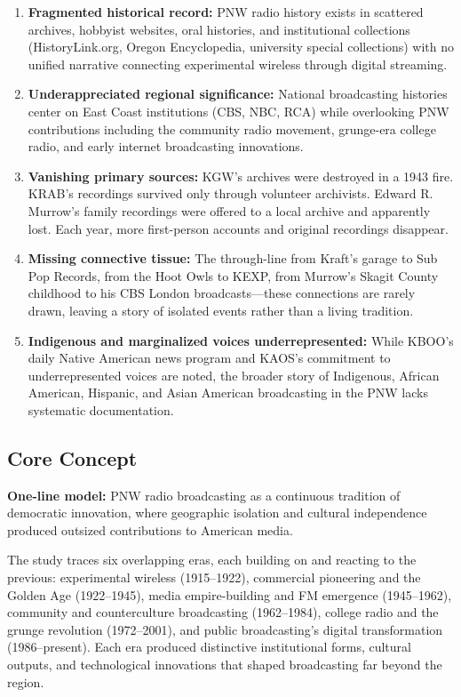 \documentclass[11pt,letterpaper]{article}
\begin{document}
\begin{enumerate}[leftmargin=2em]
\item \textbf{Fragmented historical record:} PNW radio history exists in scattered archives, hobbyist websites, oral histories, and institutional collections (HistoryLink.org, Oregon Encyclopedia, university special collections) with no unified narrative connecting experimental wireless through digital streaming.
\item \textbf{Underappreciated regional significance:} National broadcasting histories center on East Coast institutions (CBS, NBC, RCA) while overlooking PNW contributions including the community radio movement, grunge-era college radio, and early internet broadcasting innovations.
\item \textbf{Vanishing primary sources:} KGW's archives were destroyed in a 1943 fire. KRAB's recordings survived only through volunteer archivists. Edward R. Murrow's family recordings were offered to a local archive and apparently lost. Each year, more first-person accounts and original recordings disappear.
\item \textbf{Missing connective tissue:} The through-line from Kraft's garage to Sub Pop Records, from the Hoot Owls to KEXP, from Murrow's Skagit County childhood to his CBS London broadcasts---these connections are rarely drawn, leaving a story of isolated events rather than a living tradition.
\item \textbf{Indigenous and marginalized voices underrepresented:} While KBOO's daily Native American news program and KAOS's commitment to underrepresented voices are noted, the broader story of Indigenous, African American, Hispanic, and Asian American broadcasting in the PNW lacks systematic documentation.
\end{enumerate}

\subsection{Core Concept}

\textbf{One-line model:} PNW radio broadcasting as a continuous tradition of democratic innovation, where geographic isolation and cultural independence produced outsized contributions to American media.

The study traces six overlapping eras, each building on and reacting to the previous: experimental wireless (1915--1922), commercial pioneering and the Golden Age (1922--1945), media empire-building and FM emergence (1945--1962), community and counterculture broadcasting (1962--1984), college radio and the grunge revolution (1972--2001), and public broadcasting's digital transformation (1986--present). Each era produced distinctive institutional forms, cultural outputs, and technological innovations that shaped broadcasting far beyond the region.
\end{document}
